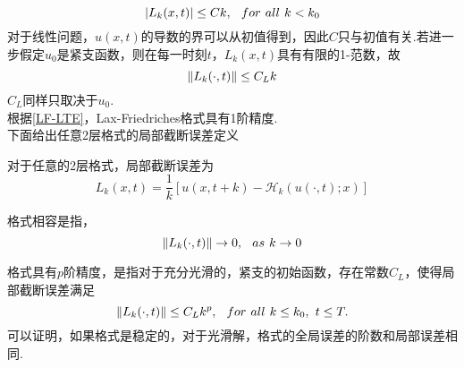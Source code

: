 \begin{equation}
\lvert L_k(x,t)\rvert \le Ck , \hspace{0.1in} for \hspace{0.05in} all \hspace{0.05in} k < k_0
\end{equation}
对于线性问题，$u(x,t)$的导数的界可以从初值得到，因此$C$只与初值有关.若进一步假定$u_0$是紧支函数，则在每一时刻$t$，$L_k(x,t)$具有有限的1-范数，故
\begin{equation} \label{LF-LTE}
	\lVert L_k(\cdot,t)\rVert \le C_L k
\end{equation}
$C_L$同样只取决于$u_0$. \\
根据\eqref{LF-LTE}，Lax-Friedriches格式具有1阶精度.\\
下面给出任意2层格式的局部截断误差定义
\begin{mydef}
	对于任意的2层格式，局部截断误差为
	\begin{equation} \label{LTE}
		L_k(x,t) = \frac{1}{k} [u(x,t+k)-\mathcal{H}_k(u(\cdot,t);x)]
	\end{equation}
\end{mydef}

\begin{mydef}
	格式相容是指，
	\begin{equation}
		\lVert L_k(\cdot,t)\rVert \to 0, \hspace{0.1in} as \hspace{0.05in} k \to 0
	\end{equation}
\end{mydef}

\begin{mydef}
	格式具有$p$阶精度，是指对于充分光滑的，紧支的初始函数，存在常数$C_L$，使得局部截断误差满足
	\begin{equation} \label{error order}
		\lVert L_k(\cdot,t)\rVert \le C_L k^p, \hspace{0.1in} for \hspace{0.05in} all \hspace{0.05in} k \le k_0,\hspace{0.05in} t\le T.		
	\end{equation}
	可以证明，如果格式是稳定的，对于光滑解，格式的全局误差的阶数和局部误差相同.
\end{mydef}

